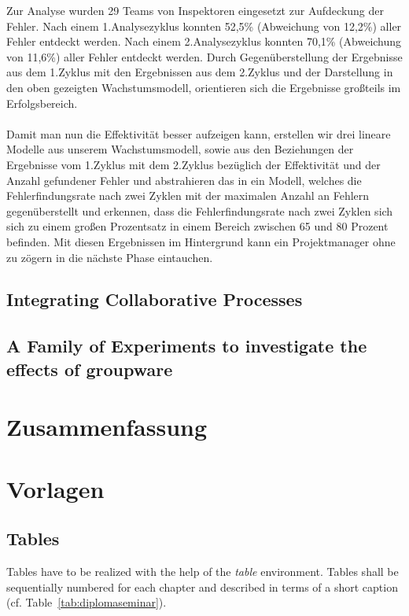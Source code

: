 \documentclass{llncs}
\begin{document}
Zur Analyse wurden 29 Teams von Inspektoren eingesetzt zur Aufdeckung der Fehler. Nach einem 1.Analysezyklus konnten 52,5\% (Abweichung von 12,2\%) aller Fehler entdeckt werden. Nach einem 2.Analysezyklus konnten 70,1\% (Abweichung von 11,6\%) aller Fehler entdeckt werden. Durch Gegenüberstellung der Ergebnisse aus dem 1.Zyklus mit den Ergebnissen aus dem 2.Zyklus und der Darstellung in den oben gezeigten Wachstumsmodell, orientieren sich die Ergebnisse großteils im Erfolgsbereich.
\\ \\
Damit man nun die Effektivität besser aufzeigen kann, erstellen wir drei lineare Modelle aus unserem Wachstumsmodell, sowie aus den Beziehungen der Ergebnisse vom 1.Zyklus mit dem 2.Zyklus bezüglich der Effektivität und der Anzahl gefundener Fehler und abstrahieren das in ein Modell, welches die Fehlerfindungsrate nach zwei Zyklen mit der maximalen Anzahl an Fehlern gegenüberstellt und erkennen, dass die Fehlerfindungsrate nach zwei Zyklen sich sich zu einem großen Prozentsatz in einem Bereich zwischen 65 und 80 Prozent befinden. Mit diesen Ergebnissen im Hintergrund kann ein Projektmanager ohne zu zögern in die nächste Phase eintauchen.


\subsection{Integrating Collaborative Processes}

\subsection{A Family of Experiments to investigate the effects of groupware}

\section{Zusammenfassung}


\section{Vorlagen}

\subsection{Tables}
Tables have to be realized with the help of the \textit{table} environment. Tables shall be sequentially numbered for each chapter and described in terms of a short caption (cf. Table~\ref{tab:diplomaseminar}).
\end{document}
